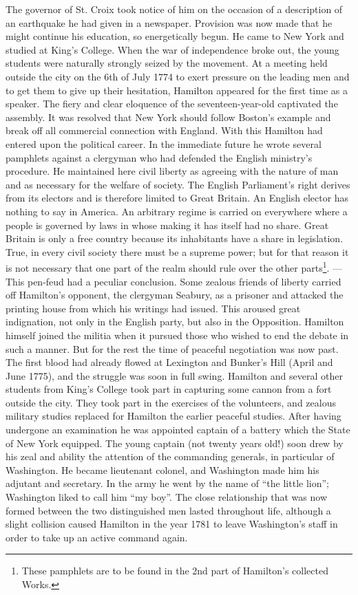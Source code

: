 \documentclass[12pt,a4paper,openany]{book}
\newcommand{\opage}[1]{\marginnote{\footnotesize\textit{[#1]}}}
\begin{document}
The governor of St. Croix took notice of him on
the occasion of a description of an earthquake he had given
in a newspaper. Provision was now made that he might continue
his education, so energetically begun. He came to
New York and studied at King's College. When the war of independence
broke out, the young students were naturally strongly seized by
the movement. At a meeting held outside the city on the
6th of July 1774 to exert pressure on the leading men and
to get them to give up their hesitation, Hamilton appeared for the first
time as a speaker. The fiery and clear eloquence of the seventeen-year-old
captivated the assembly. It was resolved that New York
\opage{126}should follow Boston's example and break off all commercial connection
with England. With this Hamilton had entered upon the political
career. In the immediate future he wrote several
pamphlets against a clergyman who had defended the English
ministry's procedure. He maintained here civil
liberty as agreeing with the nature of man and as
necessary for the welfare of society. The English Parliament's
right derives from its electors and is therefore limited to
Great Britain. An English elector has nothing to say in America.
An arbitrary regime is carried on everywhere where a people
is governed by laws in whose making it has itself had
no share. Great Britain is only a free country because its
inhabitants have a share in legislation. True, in every
civil society there must be a supreme power; but for that reason
it is not necessary that one part of the realm should rule over the other parts\footnote{These pamphlets are to be found in the 2nd part of Hamilton's collected Works.}.
--- This pen-feud had a peculiar conclusion. Some
zealous friends of liberty carried off Hamilton's opponent, the clergyman
Seabury, as a prisoner and attacked the printing house from which
his writings had issued. This aroused great indignation, not
only in the English party, but also in the Opposition.
Hamilton himself joined the militia when it pursued those
who wished to end the debate in such a manner. But for the rest
the time of peaceful negotiation was now past. The first blood had
already flowed at Lexington and Bunker's Hill (April and June 1775),
and the struggle was soon in full swing. Hamilton and several other
students from King's College took part in capturing some
cannon from a fort outside the city. They took part in the exercises of the
volunteers, and zealous military studies replaced for Hamilton the
earlier peaceful studies. After having undergone an
examination he was appointed captain of a battery which
the State of New York equipped. The young captain (not twenty
years old!) soon drew by his zeal and ability the
attention of the commanding generals, in particular of Washington.
He became lieutenant colonel, and Washington made
him his adjutant and secretary. In the army he went by the
name of ``the little lion''; Washington liked to call him
\opage{127}``my boy''. The close relationship that was now formed between
the two distinguished men lasted throughout life, although
a slight collision caused Hamilton in the year 1781 to leave
Washington's staff in order to take up an active command again.
\end{document}
